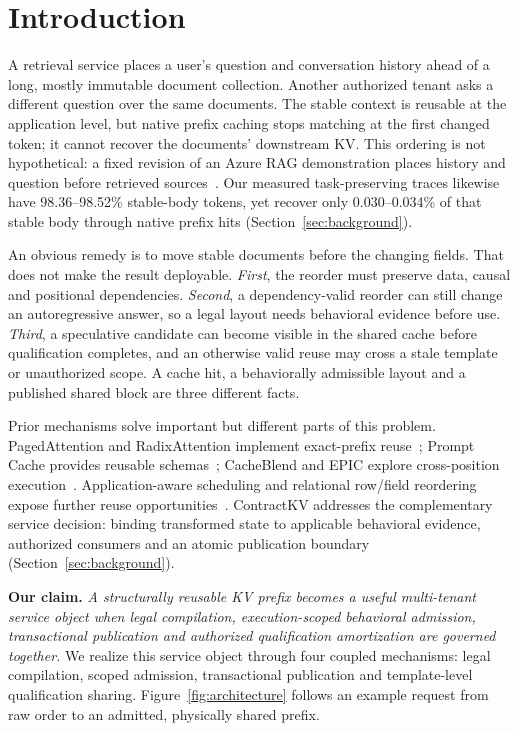 \section{Introduction}
\label{sec:introduction}
A retrieval service places a user's question and conversation history ahead of a long, mostly immutable document collection. Another authorized tenant asks a different question over the same documents. The stable context is reusable at the application level, but native prefix caching stops matching at the first changed token; it cannot recover the documents' downstream KV. This ordering is not hypothetical: a fixed revision of an Azure RAG demonstration places history and question before retrieved sources~\cite{azuretemplate}. Our measured task-preserving traces likewise have 98.36--98.52\% stable-body tokens, yet recover only 0.030--0.034\% of that stable body through native prefix hits (Section~\ref{sec:background}).

An obvious remedy is to move stable documents before the changing fields. That does not make the result deployable. \emph{First}, the reorder must preserve data, causal and positional dependencies. \emph{Second}, a dependency-valid reorder can still change an autoregressive answer, so a legal layout needs behavioral evidence before use. \emph{Third}, a speculative candidate can become visible in the shared cache before qualification completes, and an otherwise valid reuse may cross a stale template or unauthorized scope. A cache hit, a behaviorally admissible layout and a published shared block are three different facts.

Prior mechanisms solve important but different parts of this problem. PagedAttention and RadixAttention implement exact-prefix reuse~\cite{vllm2023,sglang2024}; Prompt Cache provides reusable schemas~\cite{promptcache2024}; CacheBlend and EPIC explore cross-position execution~\cite{cacheblend2025,epic2025}. Application-aware scheduling and relational row/field reordering expose further reuse opportunities~\cite{parrot2024,llmqueries2025}. ContractKV addresses the complementary service decision: binding transformed state to applicable behavioral evidence, authorized consumers and an atomic publication boundary (Section~\ref{sec:background}).

\noindent\textbf{Our claim.} \emph{A structurally reusable KV prefix becomes a useful multi-tenant service object when legal compilation, execution-scoped behavioral admission, transactional publication and authorized qualification amortization are governed together.} We realize this service object through four coupled mechanisms: legal compilation, scoped admission, transactional publication and template-level qualification sharing. Figure~\ref{fig:architecture} follows an example request from raw order to an admitted, physically shared prefix.

